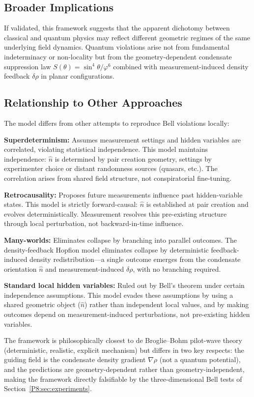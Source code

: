 \documentclass[11pt,a4paper]{article}
\theoremstyle{definition}
\theoremstyle{remark}
\newcommand{\vp}{\varphi}
\begin{document}
\subsection{Broader Implications}

If validated, this framework suggests that the apparent dichotomy between classical and quantum physics may reflect different geometric regimes of the same underlying field dynamics. Quantum violations arise not from fundamental indeterminacy or non-locality but from the geometry-dependent condensate suppression law $S(\theta)=\sin^4\!\theta/\vp^6$ combined with measurement-induced density feedback $\delta\rho$ in planar configurations.

\subsection{Relationship to Other Approaches}

The model differs from other attempts to reproduce Bell violations locally:

\textbf{Superdeterminism:} Assumes measurement settings and hidden variables are correlated, violating statistical independence. This model maintains independence: $\hat{n}$ is determined by pair creation geometry, settings by experimenter choice or distant randomness sources (quasars, etc.). The correlation arises from shared field structure, not conspiratorial fine-tuning.

\textbf{Retrocausality:} Proposes future measurements influence past hidden-variable states. This model is strictly forward-causal: $\hat{n}$ is established at pair creation and evolves deterministically. Measurement resolves this pre-existing structure through local perturbation, not backward-in-time influence.

\textbf{Many-worlds:} Eliminates collapse by branching into parallel outcomes. The density-feedback Hopfion model eliminates collapse by deterministic feedback-induced density redistribution---a single outcome emerges from the condensate orientation $\hat{n}$ and measurement-induced $\delta\rho$, with no branching required.

\textbf{Standard local hidden variables:} Ruled out by Bell's theorem under certain independence assumptions. This model evades these assumptions by using a shared geometric object ($\hat{n}$) rather than independent local values, and by making outcomes depend on measurement-induced perturbations, not pre-existing hidden variables.

The framework is philosophically closest to de Broglie--Bohm pilot-wave theory (deterministic, realistic, explicit mechanism) but differs in two key respects: the guiding field is the condensate density gradient $\nabla\rho$ (not a quantum potential), and the predictions are geometry-dependent rather than geometry-independent, making the framework directly falsifiable by the three-dimensional Bell tests of Section~\ref{P8:sec:experiments}.
\end{document}
